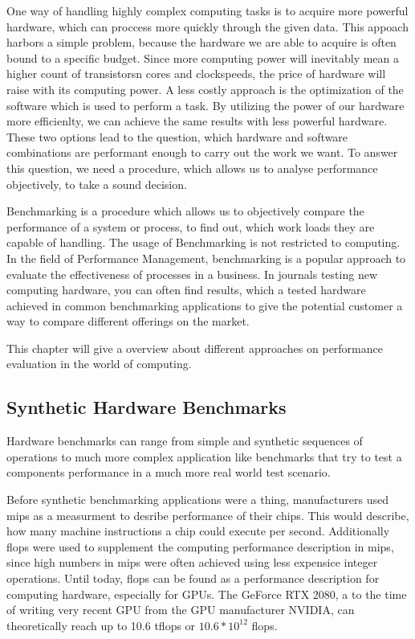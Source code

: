 One way of handling highly complex computing tasks is to acquire more powerful
hardware, which can proccess more quickly through the given data. This appoach
harbors a simple problem, because the hardware we are able to acquire is often
bound to a specific budget. Since more computing power will inevitably mean a
higher count of transistorsn cores and clockspeeds, the price of hardware will
raise with its computing power. A less costly approach is the optimization of
the software which is used to perform a task. By utilizing the power of our
hardware more efficienlty, we can achieve the same results with less powerful
hardware. These two options lead to the question, which hardware and software
combinations are performant enough to carry out the work we want. To answer this
question, we need a procedure, which allows us to analyse performance
objectively, to take a sound decision.

\cite{mooresLaw}

Benchmarking is a procedure which allows us to objectively compare the
performance of a system or process, to find out, which work loads they are
capable of handling. The usage of Benchmarking is not restricted to computing.
In the field of Performance Management, benchmarking is a popular approach to
evaluate the effectiveness of processes in a business. In journals testing new
computing hardware, you can often find results, which a tested hardware achieved
in common benchmarking applications to give the potential customer a way to
compare different offerings on the market.

\cite{BenchmPerfManagement}

This chapter will give a overview about different approaches on performance
evaluation in the world of computing.





\subsection{Synthetic Hardware Benchmarks}

Hardware benchmarks can range from simple and synthetic sequences of operations
to much more complex application like benchmarks that try to test a components
performance in a much more real world test scenario.

Before synthetic benchmarking applications were a thing, manufacturers used
\gls{mips} as a measurment to desribe performance of their chips. This would
describe, how many machine instructions a chip could execute per second.
Additionally \gls{flops} were used to supplement the computing performance
description in \gls{mips}, since high numbers in \gls{mips} were often achieved
using less expensice integer operations. Until today, \gls{flops} can be found
as a performance description for computing hardware, especially for GPUs. The
GeForce RTX 2080, a to the time of writing very recent GPU from the GPU
manufacturer NVIDIA, can theoretically reach up to 10.6 \gls{tflops} or $10.6 *
10^{12}$ \gls{flops}.

